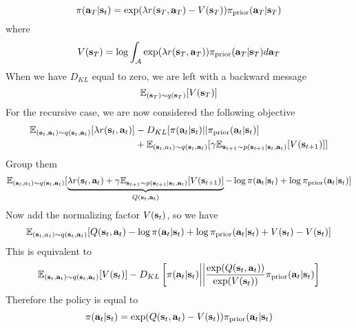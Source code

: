 \begin{equation}
\pi(\bold{a}_T | \bold{s}_t) = \exp(\lambda r(\bold{s}_T, \bold{a}_T) - V(\bold{s}_T) ) \pi_{\text{prior}}(\bold{a}_T | \bold{s}_T)
\end{equation}
where 
$$
V(\bold{s}_T) = \log \int_{\mathcal{A}} \exp(\lambda r(\bold{s}_T, \bold{a}_T)) \pi_{\text{prior}}(\bold{a}_T | \bold{s}_T) d \bold{a}_T
$$
When we have $D_{KL}$ equal to zero, we are left with a backward message  $$\mathbb{E}_{(\bold{s}_T) \sim q(\bold{s}_T)}[V(\bold{s}_T)]$$
For the recursive case, we are now considered the following objective 
\begin{equation}
\begin{aligned}
    \mathbb{E}_{(\bold{s}_t, \bold{a}_t) \sim q(\bold{s}_t, \bold{a}_t)} [\lambda  r(\bold{s}_t, \bold{a}_t)] &- D_{KL} [\pi(\bold{a}_t | \bold{s}_t) || \pi_{\text{prior}}(\bold{a}_t | \bold{s}_t)] \\ 
    &+ \mathbb{E}_{(\bold{s}_t, a_t) \sim q(\bold{s}_t, \bold{a}_t)} [\gamma \mathbb{E}_{\bold{s}_{t+1} \sim p(\bold{s}_{t+1} | \bold{s}_t, \bold{a}_t)}[ V(\bold{s}_{t+1})]]
\end{aligned}
\end{equation}
Group them 
\begin{equation}
\mathbb{E}_{(\bold{s}_t, a_t) \sim q(\bold{s}_t, \bold{a}_t)} [\underbrace{\lambda  r(\bold{s}_t, \bold{a}_t) + \gamma \mathbb{E}_{\bold{s}_{t+1} \sim p(\bold{s}_{t+1} | \bold{s}_t, \bold{a}_t)}[ V(\bold{s}_{t+1})]}_{Q(\bold{s}_t, \bold{a}_t)} - \log \pi(\bold{a}_t | \bold{s}_t) + \log \pi_{\text{prior}}(\bold{a}_t | \bold{s}_t) ]
\end{equation}
Now add the normalizing factor $V(\bold{s}_t)$, so we have 
\begin{equation}
\mathbb{E}_{(\bold{s}_t, a_t) \sim q(\bold{s}_t, \bold{a}_t)} [Q(\bold{s}_t, \bold{a}_t) - \log \pi(\bold{a}_t | \bold{s}_t) + \log \pi_{\text{prior}}(\bold{a}_t | \bold{s}_t) + V(\bold{s}_t) - V(\bold{s}_t) ]
\end{equation}
This is equivalent to 
\begin{equation}
\mathbb{E}_{(\bold{s}_t, \bold{a}_t) \sim q(\bold{s}_t, \bold{a}_t)} [ V(\bold{s}_t)] - D_{KL}\left[ \pi(\bold{a}_t | \bold{s}_t) \bigg|\bigg| \frac{\exp(Q(\bold{s}_t, \bold{a}_t))}{\exp(V(\bold{s}_t))} \pi_{\text{prior}}(\bold{a}_t | \bold{s}_t) \right]
\end{equation}
Therefore the policy is equal to 
\begin{equation}
    \pi(\bold{a}_t | \bold{s}_t) = \exp(Q(\bold{s}_t, \bold{a}_t) - V(\bold{s}_t)) \pi_{\text{prior}} (\bold{a}_t | \bold{s}_t)
\end{equation}
